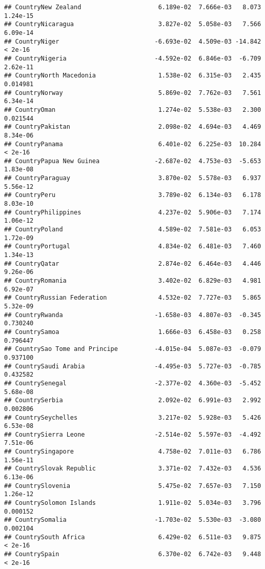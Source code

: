 \documentclass[
]{article}
\begin{document}
\begin{verbatim}
## CountryNew Zealand                     6.189e-02  7.666e-03   8.073 1.24e-15
## CountryNicaragua                       3.827e-02  5.058e-03   7.566 6.09e-14
## CountryNiger                          -6.693e-02  4.509e-03 -14.842  < 2e-16
## CountryNigeria                        -4.592e-02  6.846e-03  -6.709 2.62e-11
## CountryNorth Macedonia                 1.538e-02  6.315e-03   2.435 0.014981
## CountryNorway                          5.869e-02  7.762e-03   7.561 6.34e-14
## CountryOman                            1.274e-02  5.538e-03   2.300 0.021544
## CountryPakistan                        2.098e-02  4.694e-03   4.469 8.34e-06
## CountryPanama                          6.401e-02  6.225e-03  10.284  < 2e-16
## CountryPapua New Guinea               -2.687e-02  4.753e-03  -5.653 1.83e-08
## CountryParaguay                        3.870e-02  5.578e-03   6.937 5.56e-12
## CountryPeru                            3.789e-02  6.134e-03   6.178 8.03e-10
## CountryPhilippines                     4.237e-02  5.906e-03   7.174 1.06e-12
## CountryPoland                          4.589e-02  7.581e-03   6.053 1.72e-09
## CountryPortugal                        4.834e-02  6.481e-03   7.460 1.34e-13
## CountryQatar                           2.874e-02  6.464e-03   4.446 9.26e-06
## CountryRomania                         3.402e-02  6.829e-03   4.981 6.92e-07
## CountryRussian Federation              4.532e-02  7.727e-03   5.865 5.32e-09
## CountryRwanda                         -1.658e-03  4.807e-03  -0.345 0.730240
## CountrySamoa                           1.666e-03  6.458e-03   0.258 0.796447
## CountrySao Tome and Principe          -4.015e-04  5.087e-03  -0.079 0.937100
## CountrySaudi Arabia                   -4.495e-03  5.727e-03  -0.785 0.432582
## CountrySenegal                        -2.377e-02  4.360e-03  -5.452 5.68e-08
## CountrySerbia                          2.092e-02  6.991e-03   2.992 0.002806
## CountrySeychelles                      3.217e-02  5.928e-03   5.426 6.53e-08
## CountrySierra Leone                   -2.514e-02  5.597e-03  -4.492 7.51e-06
## CountrySingapore                       4.758e-02  7.011e-03   6.786 1.56e-11
## CountrySlovak Republic                 3.371e-02  7.432e-03   4.536 6.13e-06
## CountrySlovenia                        5.475e-02  7.657e-03   7.150 1.26e-12
## CountrySolomon Islands                 1.911e-02  5.034e-03   3.796 0.000152
## CountrySomalia                        -1.703e-02  5.530e-03  -3.080 0.002104
## CountrySouth Africa                    6.429e-02  6.511e-03   9.875  < 2e-16
## CountrySpain                           6.370e-02  6.742e-03   9.448  < 2e-16

\end{verbatim}
\end{document}
